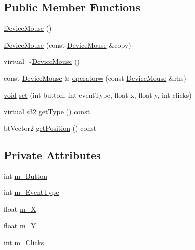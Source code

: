 \subsection*{Public Member Functions}
\begin{DoxyCompactItemize}
\item 
\mbox{\hyperlink{classnjli_1_1_device_mouse_aee8091e8d7089bf8428e73dee2fd4002}{Device\+Mouse}} ()
\item 
\mbox{\hyperlink{classnjli_1_1_device_mouse_a20e7fb08cd22c231a3379e6a492a1fb8}{Device\+Mouse}} (const \mbox{\hyperlink{classnjli_1_1_device_mouse}{Device\+Mouse}} \&copy)
\item 
virtual \mbox{\hyperlink{classnjli_1_1_device_mouse_a627f38bca78b41bb6b62fd7f3577a0e9}{$\sim$\+Device\+Mouse}} ()
\item 
const \mbox{\hyperlink{classnjli_1_1_device_mouse}{Device\+Mouse}} \& \mbox{\hyperlink{classnjli_1_1_device_mouse_ae9fb49d3da9395268f61e508581589af}{operator=}} (const \mbox{\hyperlink{classnjli_1_1_device_mouse}{Device\+Mouse}} \&rhs)
\item 
\mbox{\hyperlink{_thread_8h_af1e856da2e658414cb2456cb6f7ebc66}{void}} \mbox{\hyperlink{classnjli_1_1_device_mouse_a176cdee101650df7a86e82e8834e5156}{set}} (int button, int event\+Type, float x, float y, int clicks)
\item 
virtual \mbox{\hyperlink{_util_8h_aa62c75d314a0d1f37f79c4b73b2292e2}{s32}} \mbox{\hyperlink{classnjli_1_1_device_mouse_acfb2479b7c88042d6fb5ce58b4482264}{get\+Type}} () const
\item 
bt\+Vector2 \mbox{\hyperlink{classnjli_1_1_device_mouse_acb280f0e78e60d2c6c449d09696c5365}{get\+Position}} () const
\end{DoxyCompactItemize}
\subsection*{Private Attributes}
\begin{DoxyCompactItemize}
\item 
int \mbox{\hyperlink{classnjli_1_1_device_mouse_afa3955b20a42c0234eab02d746210a2a}{m\+\_\+\+Button}}
\item 
int \mbox{\hyperlink{classnjli_1_1_device_mouse_ae16fcaa5513c79bfc053432d7fff90a1}{m\+\_\+\+Event\+Type}}
\item 
float \mbox{\hyperlink{classnjli_1_1_device_mouse_ad62299ae082d8a421bfbcc0934d4512c}{m\+\_\+X}}
\item 
float \mbox{\hyperlink{classnjli_1_1_device_mouse_a565bc5cfae357af3e49c616c8ea21c82}{m\+\_\+Y}}
\item 
int \mbox{\hyperlink{classnjli_1_1_device_mouse_aaa91c08bed2545ae7c00f8ae84b23d22}{m\+\_\+\+Clicks}}
\end{DoxyCompactItemize}
